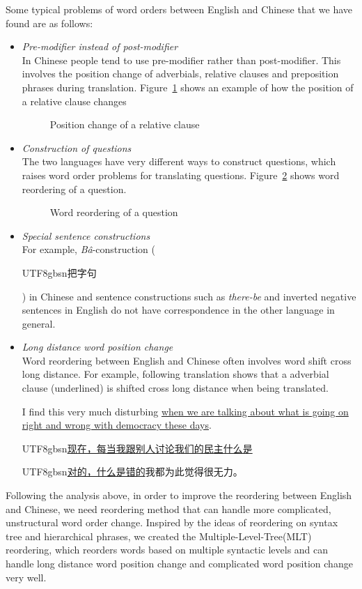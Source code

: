 \documentclass[a4paper]{article}
\newcommand{\cntext}[1]{\begin{CJK}{UTF8}{gbsn}#1\end{CJK}}
\begin{document}
Some typical problems of word orders between English and Chinese that we have found are as follows:

\begin{itemize}
\item \emph{Pre-modifier instead of post-modifier}\\ In Chinese people tend to use pre-modifier rather than post-modifier. This involves the position change of adverbials, relative clauses and preposition phrases during translation. Figure~\ref{relative} shows an example of how the position of a relative clause changes
\begin{figure}

\caption{Position change of a relative clause}
\label{relative}
\end{figure}
\item \emph{Construction of questions}\\
The two languages have very different ways to construct questions, which raises word order problems for translating questions. Figure~\ref{question} shows word reordering of a question.
\begin{figure}

\caption{Word reordering of a question}
\label{question}
\end{figure}
\item \emph{Special sentence constructions}\\ For example, \emph{B\^{a}}-construction (\cntext{把字句}) in Chinese and sentence constructions such as \emph{there-be} and inverted negative sentences in English do not have correspondence in the other language in general.
\item \emph{Long distance word position change}\\
Word reordering between English and Chinese often involves word shift cross long distance. For example, following translation shows that a adverbial clause (underlined) is shifted cross long distance when being translated.\bigskip \\
\parbox{0.3705\textwidth}{
I find this very much disturbing \uline{when we are talking about what is going on right and wrong with democracy these days}.\medskip\\
\cntext{\uline{现在，每当我跟别人讨论我们的民主什么是}}
\cntext{\uline{对的，什么是错的}我都为此觉得很无力。}
}
\end{itemize}

Following the analysis above, in order to improve the reordering between English and Chinese, we need reordering method that can handle more complicated, unstructural word order change. Inspired by the ideas of reordering on syntax tree and hierarchical phrases, we created the Multiple-Level-Tree(MLT) reordering, which reorders words based on multiple syntactic levels and can handle long distance word position change and complicated word position change very well.
\end{document}
